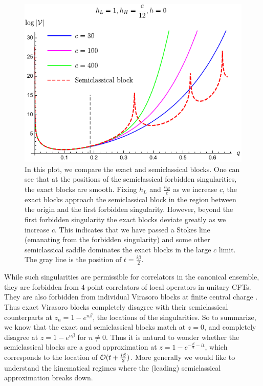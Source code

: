 \documentclass[12pt]{article}
\numberwithin{equation}{section}
\newcommand{\CO}{{\cal O}}
\begin{document}
\begin{figure}[t]
\centering{}\includegraphics[]{forbiddensingularity}
\caption{In this plot, we compare the exact and semiclassical blocks. One can see that at the positions of the semiclassical forbidden singularities, the exact blocks are smooth. Fixing $h_L$ and $\frac{h_H}{c}$ as we increase $c$, the exact blocks approach the semiclassical block in the region between the origin and the first forbidden singularity.  However, beyond the first forbidden singularity the exact blocks deviate greatly as we increase $c$.  This indicates that we have passed a Stokes line (emanating from the forbidden singularity) and some other semiclassical saddle dominates the exact blocks in the large $c$ limit.  The gray line is the position of $t =  \frac{i \beta}{2}$.}
\label{fig:forbidden}
\end{figure}

While such singularities are permissible for correlators in the canonical ensemble, they are forbidden \cite{Maldacena:2015iua, Fitzpatrick:2016ive} from 4-point correlators of local operators in unitary CFTs.  They are also forbidden from individual Virasoro blocks at finite central charge \cite{Fitzpatrick:2016ive, Fitzpatrick:2016mjq}.  Thus exact Virasoro blocks completely disagree with their semiclassical counterparts at $z_n = 1 - e^{n \beta}$, the locations of the singularities.  So to summarize, we know that the exact and semiclassical blocks match at $z = 0$, and completely disagree at $z = 1 - e^{n \beta}$ for $n \neq 0$.  Thus it is natural to wonder whether the semiclassical blocks are a good approximation at $z = 1 - e^{-\frac{\beta}{2} -it}$, which corresponds to the location of $\CO(t + \frac{i \beta}{2})$.  More generally we would like to understand the kinematical regimes where the (leading) semiclassical approximation breaks down.
\end{document}
